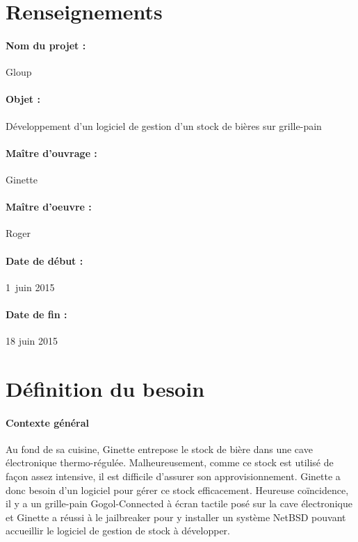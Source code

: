 \documentclass[a4paper,oneside]{article}
\title{\mytitle }
\author{Ginette et Roger}
\date{1\ier~juin 2015}
\begin{document}
\maketitle

\thispagestyle{fancyplain}



\section{Renseignements}

\paragraph{Nom du projet :}
Gloup

\paragraph{Objet :}
Développement d'un logiciel de gestion d'un stock de bières sur grille-pain

\paragraph{Maître d'ouvrage :}
Ginette

\paragraph{Maître d'oeuvre : }
Roger

\paragraph{Date de début :}
1\ier~juin 2015

\paragraph{Date de fin :}
18 juin 2015



\newpage

\section{Définition du besoin}

\paragraph{Contexte général\\}
Au fond de sa cuisine, Ginette entrepose le stock de bière dans une cave électronique thermo-régulée.
Malheureusement, comme ce stock est utilisé de façon assez intensive, il est difficile d'assurer son approvisionnement.
Ginette a donc besoin d'un logiciel pour gérer ce stock efficacement.
Heureuse coïncidence, il y a un grille-pain Gogol-Connected à écran tactile posé sur la cave électronique et Ginette a réussi à le jailbreaker pour y installer un système NetBSD pouvant accueillir le logiciel de gestion de stock à développer.
\end{document}
